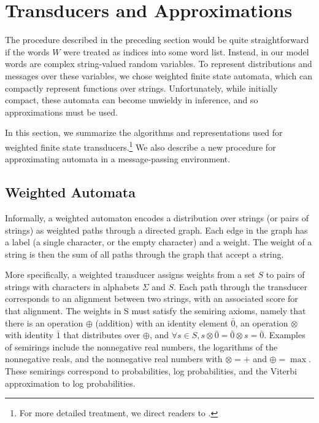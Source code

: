\documentclass[11pt,a4paper]{article}
\begin{document}
\section{Transducers and Approximations}

The procedure described in the preceding section would be quite
straightforward if the words $W$ were treated as indices into some
word list. Instead, in our model words are complex string-valued
random variables. To represent distributions and messages over these
variables, we chose weighted finite state automata, which can
compactly represent functions over strings. Unfortunately, while
initially compact, these automata can become unwieldy in inference,
and so approximations must be used.

In this section, we summarize the algorithms and representations
used for weighted finite state transducers.\footnote{For more
detailed treatment, we direct readers to .}
We also describe a new procedure for approximating automata in a
message-passing environment.

\subsection{Weighted Automata}

Informally, a weighted automaton encodes a distribution over strings
(or pairs of strings) as weighted paths through a directed graph.
Each edge in the graph has a label (a single character, or the empty
character) and a weight. The weight of a string is then the sum
of all paths through the graph that accept a string.

More specifically, a weighted transducer assigns weights from a set
$S$ to pairs of strings with characters in alphabets $\Sigma$ and
$S$. Each path through the transducer corresponds to an alignment
between two strings, with an associated score for that alignment.
The weights in S must satisfy the semiring axioms, namely that there
is an operation $\oplus$ (addition) with an identity element $\bar
0$, an operation $\otimes$ with identity $\bar 1$ that distributes
over $\oplus$, and $\forall s\in S, s\otimes \bar 0 = \bar 0 \otimes
s = \bar 0$. Examples of semirings include the nonnegative real
numbers, the logarithms of the nonnegative reals, and the nonnegative
real numbers with $\otimes = +$ and $\oplus = \max$. These semirings
correspond to probabilities, log probabilities, and the Viterbi
approximation to log probabilities.
\end{document}
